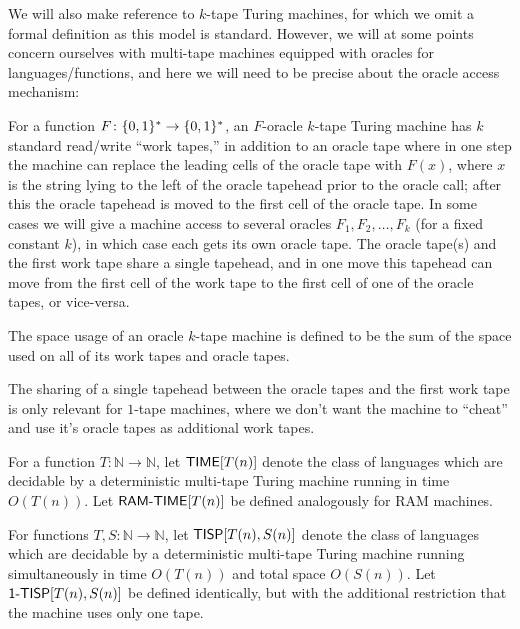 We will also make reference to $k$-tape Turing machines, for which we omit a formal definition as this model is standard. However, we will at some points concern ourselves with multi-tape machines equipped with oracles for languages/functions, and here we will need to be precise about the oracle access mechanism:
\begin{definition}
For a function $F\colon \{0,1\}^* \rightarrow \{0,1\}^*$, an $F$-oracle $k$-tape Turing machine has $k$ standard read/write ``work tapes,'' in addition to an oracle tape where in one step the machine can replace the leading cells of the oracle tape with $F(x)$, where $x$ is the string lying to the left of the oracle tapehead prior to the oracle call; after this the oracle tapehead is moved to the first cell of the oracle tape. In some cases we will give a machine access to several oracles $F_1,F_2,\ldots,F_k$ (for a fixed constant $k$), in which case each gets its own oracle tape. The oracle tape(s) and the first work tape share a single tapehead, and in one move this tapehead can move from the first cell of the work tape to the first cell of one of the oracle tapes, or vice-versa. 

The space usage of an oracle $k$-tape machine is defined to be the sum of the space used on all of its work tapes and oracle tapes.
\end{definition}
The sharing of a single tapehead between the oracle tapes and the first work tape is only relevant for $1$-tape machines, where we don't want the machine to ``cheat'' and use it's oracle tapes as additional work tapes.

\begin{definition}
\sloppy For a function $T\colon\mathbb{N} \rightarrow \mathbb{N}$, let $\cl{TIME}[T(n)]$ denote the class of languages which are decidable by a deterministic multi-tape Turing machine running in time $O(T(n))$. 
Let $\cl{RAM\dash TIME}[T(n)]$ be defined analogously for RAM machines.
\end{definition}
\begin{definition}
For functions $T,S\colon\mathbb{N} \rightarrow \mathbb{N}$, let $\cl{TISP}[T(n),S(n)]$ denote the class of languages which are decidable by a deterministic multi-tape Turing machine running simultaneously in time $O(T(n))$ and total space $O(S(n))$. Let $\cl{1\dash TISP}[T(n),S(n)]$ be defined identically, but with the additional restriction that the machine uses only one tape.
\end{definition}

